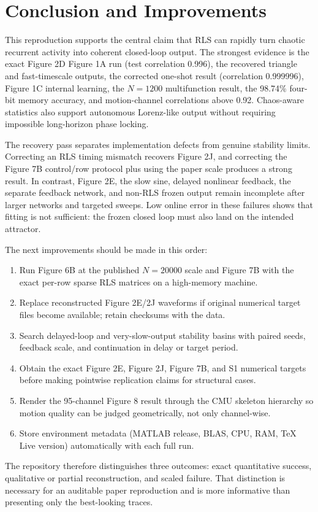 \section{Conclusion and Improvements}

This reproduction supports the central claim that RLS can rapidly turn chaotic recurrent activity into coherent closed-loop output. The strongest evidence is the exact Figure 2D Figure 1A run (test correlation 0.996), the recovered triangle and fast-timescale outputs, the corrected one-shot result (correlation 0.999996), Figure 1C internal learning, the $N=1200$ multifunction result, the 98.74\% four-bit memory accuracy, and motion-channel correlations above 0.92. Chaos-aware statistics also support autonomous Lorenz-like output without requiring impossible long-horizon phase locking.

The recovery pass separates implementation defects from genuine stability limits. Correcting an RLS timing mismatch recovers Figure 2J, and correcting the Figure 7B control/row protocol plus using the paper scale produces a strong result. In contrast, Figure 2E, the slow sine, delayed nonlinear feedback, the separate feedback network, and non-RLS frozen output remain incomplete after larger networks and targeted sweeps. Low online error in these failures shows that fitting is not sufficient: the frozen closed loop must also land on the intended attractor.

The next improvements should be made in this order:
\begin{enumerate}
    \item Run Figure 6B at the published $N=20000$ scale and Figure 7B with the exact per-row sparse RLS matrices on a high-memory machine.
    \item Replace reconstructed Figure 2E/2J waveforms if original numerical target files become available; retain checksums with the data.
    \item Search delayed-loop and very-slow-output stability basins with paired seeds, feedback scale, and continuation in delay or target period.
    \item Obtain the exact Figure 2E, Figure 2J, Figure 7B, and S1 numerical targets before making pointwise replication claims for structural cases.
    \item Render the 95-channel Figure 8 result through the CMU skeleton hierarchy so motion quality can be judged geometrically, not only channel-wise.
    \item Store environment metadata (MATLAB release, BLAS, CPU, RAM, TeX Live version) automatically with each full run.
\end{enumerate}

The repository therefore distinguishes three outcomes: exact quantitative success, qualitative or partial reconstruction, and scaled failure. That distinction is necessary for an auditable paper reproduction and is more informative than presenting only the best-looking traces.
